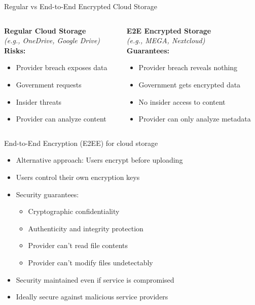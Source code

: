 \documentclass[aspectratio=169, lualatex, handout]{beamer}
\begin{document}
\begin{frame}{Regular vs End-to-End Encrypted Cloud Storage}
	\begin{columns}
		\begin{column}{0.5\textwidth}
			\textbf{Regular Cloud Storage}\\
			\textit{(e.g., OneDrive, Google Drive)}
			\\
			\vspace{0.5cm}
			\textbf{Risks:}
			\begin{itemize}
				\item Provider breach exposes data
				\item Government requests
				\item Insider threats
				\item Provider can analyze content
			\end{itemize}
		\end{column}
		\begin{column}{0.5\textwidth}
			\textbf{E2E Encrypted Storage}\\
			\textit{(e.g., MEGA, Nextcloud)}
			\\
			\vspace{0.5cm}
			\textbf{Guarantees:}
			\begin{itemize}
				\item Provider breach reveals nothing
				\item Government gets encrypted data
				\item No insider access to content
				\item Provider can only analyze metadata
			\end{itemize}
		\end{column}
	\end{columns}
\end{frame}

\begin{frame}{End-to-End Encryption (E2EE) for cloud storage}
	\begin{itemize}
		\item Alternative approach: Users encrypt before uploading
		\item Users control their own encryption keys
		\item Security guarantees:
		      \begin{itemize}
			      \item Cryptographic confidentiality
			      \item Authenticity and integrity protection
			      \item Provider can't read file contents
			      \item Provider can't modify files undetectably
		      \end{itemize}
		\item Security maintained even if service is compromised
		\item Ideally secure against malicious service providers
	\end{itemize}
\end{frame}
\end{document}
